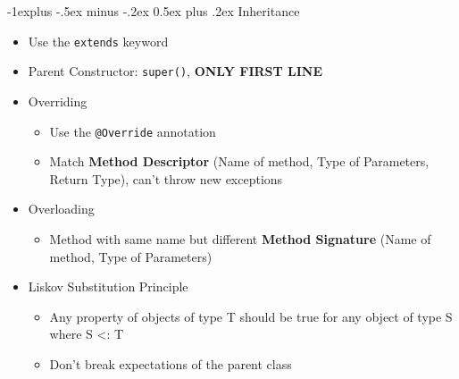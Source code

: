 \documentclass[10pt, landscape]{article}
\makeatletter
\renewcommand{\section}{\@startsection{section}{1}{0mm}%
                                {-1ex plus -.5ex minus -.2ex}%
                                {0.5ex plus .2ex}%
                                {\normalfont\large\bfseries}}
\renewcommand{\section}{\@startsection{section}{2}{0mm}%
                                {-1explus -.5ex minus -.2ex}%
                                {0.5ex plus .2ex}%
                                {\normalfont\normalsize\bfseries}}
\makeatother
\begin{document}
\begin{multicols*}{4}
\section{Inheritance}
\begin{itemize}
    \item Use the \verb|extends| keyword
    \item Parent Constructor: \verb|super()|, \textbf{ONLY FIRST LINE}
    \item Overriding
    \begin{itemize}
        \item Use the \lstinline{@Override} annotation
        \item Match \textbf{Method Descriptor} (Name of method, Type of Parameters, Return Type), can't throw new exceptions
    \end{itemize}
    \item Overloading
    \begin{itemize}
        \item Method with same name but different \textbf{Method Signature} (Name of method, Type of Parameters)
    \end{itemize}
    \item Liskov Substitution Principle
    \begin{itemize}
        \item Any property of objects of type T should be true for any object of type S where S <: T
        \item Don't break expectations of the parent class
    \end{itemize}
\end{itemize}


\end{multicols*}
\end{document}
